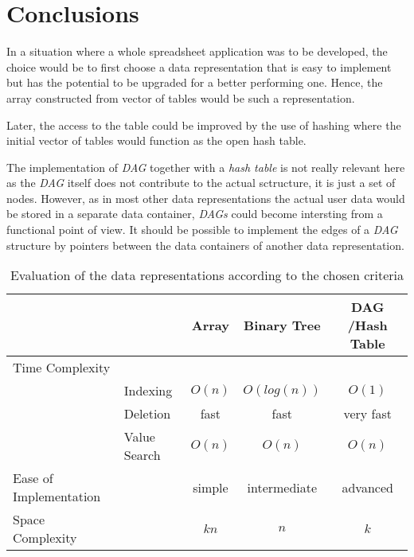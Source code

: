 \documentclass[a4paper,11pt,twoside]{article}
\begin{document}
\section{Conclusions}

In a situation where a whole spreadsheet application was to be
developed, the choice would be to first choose a data representation
that is easy to implement but has the potential to be upgraded for a
better performing one. Hence, the array constructed from vector of
tables would be such a representation.

Later, the access to the table could be improved by the use of hashing
where the initial vector of tables would function as the open hash
table.

The implementation of \textit{DAG} together with a \textit{hash table}
is not really relevant here as the \textit{DAG} itself does not
contribute to the actual sctructure, it is just a set of
nodes. However, as in most other data representations the actual user
data would be stored in a separate data container, \textit{DAGs} could
become intersting from a functional point of view. It should be
possible to implement the edges of a \textit{DAG} structure by pointers between
the data containers of another data representation. 


\begin{table}[]
\centering
\caption{Evaluation of the data representations according to the chosen criteria}
\label{tab:eval}
\begin{tabular}{llccc}
                       &              & Array      & Binary Tree  &
                       DAG /Hash Table \\ \hline
Time Complexity        &              &            &              &
\\
                       & Indexing & $O(n)$      & $O(log(n))$        &
                          $O(1)$      \\
                       & Deletion     & fast       & fast         &
                       very fast       \\
                       & Value Search & $O(n)$ & $O(n)$ &
                       $O(n)$      \\
Ease of Implementation &              & simple     & intermediate &
advanced \\
Space Complexity       &              & $kn$ & $n$    &
$k$     
\end{tabular}
\end{table}


\end{document}
